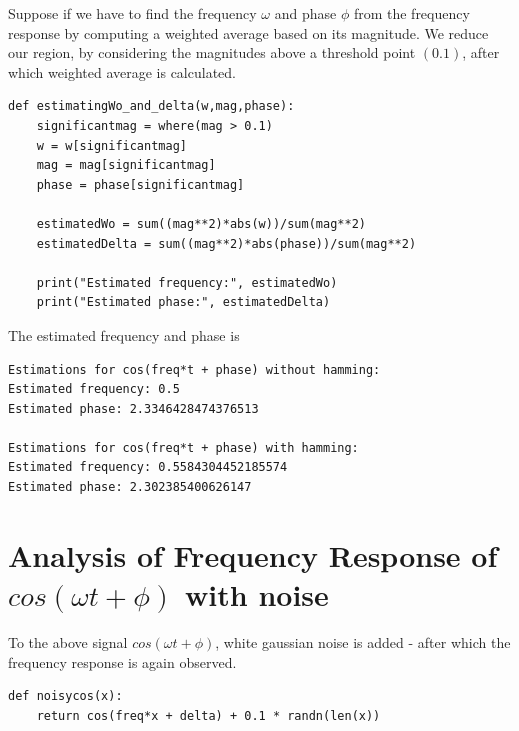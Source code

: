 \documentclass[12pt, a4paper]{report}
\begin{document}
Suppose if we have to find the frequency $\omega$ and phase $\phi$ from the frequency response by computing a weighted average based on its magnitude. We reduce our region, by considering the magnitudes above a threshold point $(0.1)$, after which weighted average is calculated.

\begin{verbatim}
def estimatingWo_and_delta(w,mag,phase):
    significantmag = where(mag > 0.1)
    w = w[significantmag]
    mag = mag[significantmag]
    phase = phase[significantmag]
    
    estimatedWo = sum((mag**2)*abs(w))/sum(mag**2)
    estimatedDelta = sum((mag**2)*abs(phase))/sum(mag**2)    
    
    print("Estimated frequency:", estimatedWo)
    print("Estimated phase:", estimatedDelta)
\end{verbatim}

The estimated frequency and phase is
\begin{verbatim}
Estimations for cos(freq*t + phase) without hamming:
Estimated frequency: 0.5
Estimated phase: 2.3346428474376513

Estimations for cos(freq*t + phase) with hamming:
Estimated frequency: 0.5584304452185574
Estimated phase: 2.302385400626147
\end{verbatim}


\section*{Analysis of Frequency Response of $cos(\omega t+ \phi)$ with noise}
To the above signal $cos(\omega t+ \phi)$, white gaussian noise is added - after which the frequency response is again observed.
\begin{verbatim}
def noisycos(x):
    return cos(freq*x + delta) + 0.1 * randn(len(x))
\end{verbatim}
 
\end{document}

